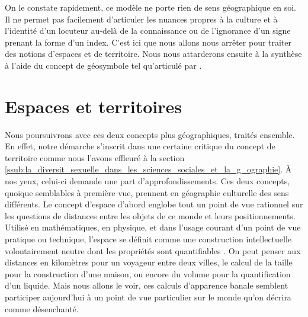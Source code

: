 On le constate rapidement, ce modèle ne porte  rien de sens géographique en soi.
Il ne permet pas facilement d'articuler les nuances propres à la culture et à l'identité d'un locuteur au-delà de la connaissance ou de l'ignorance d'un signe prenant la forme d'un index.
C'est ici que nous allons nous arrêter pour traiter des notions d'espaces et de territoire.
Nous nous attarderons ensuite à la synthèse à l'aide du concept de géosymbole tel qu'articulé par \citet{Bonnemaison1981}.


\section{Espaces et territoires}
\label{sec:espaces_et_territoires} Nous poursuivrons avec ces deux concepts plus géographiques, traités ensemble.
En effet, notre démarche s'inscrit dans une certaine critique du concept de territoire comme nous l'avons effleuré à la section \ref{ssub:la_diversit_sexuelle_dans_les_sciences_sociales_et_la_g_ographie}.
À nos yeux, celui-ci demande une part d'approfondissements.
Ces deux concepts, quoique semblables à première vue, prennent en géographie culturelle des sens différents.
Le concept d'espace d'abord englobe tout un point de vue rationnel sur les questions de distances entre les objets de ce monde et leurs positionnements.
Utilisé en mathématiques, en physique, et dans l'usage courant d'un point de vue pratique ou technique, l'espace se définit comme une construction intellectuelle volontairement neutre dont les propriétés sont quantifiables \citep[99]{DiMeo1998}.
On peut penser aux distances en kilomètres pour un voyageur entre deux villes, le calcul de la taille pour la construction d'une maison, ou encore du volume pour la quantification d'un liquide.
Mais nous allons le voir, ces calculs d'apparence banale semblent participer aujourd'hui à un point de vue particulier sur le monde qu'on décrira comme désenchanté.

